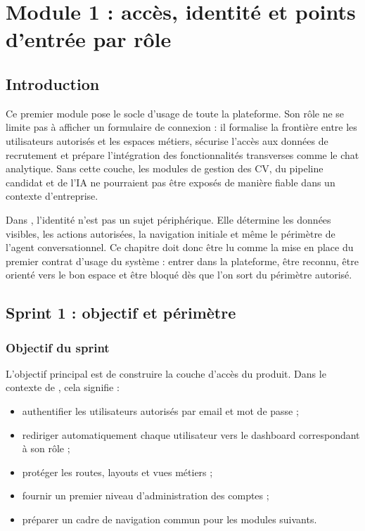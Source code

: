 \chapter{Module 1 : accès, identité et points d'entrée par rôle}

\section*{Introduction}
Ce premier module pose le socle d'usage de toute la plateforme. Son rôle ne se limite pas à afficher un formulaire de connexion : il formalise la frontière entre les utilisateurs autorisés et les espaces métiers, sécurise l'accès aux données de recrutement et prépare l'intégration des fonctionnalités transverses comme le chat analytique. Sans cette couche, les modules de gestion des CV, du pipeline candidat et de l'IA ne pourraient pas être exposés de manière fiable dans un contexte d'entreprise.

Dans \projectname{}, l'identité n'est pas un sujet périphérique. Elle détermine les données visibles, les actions autorisées, la navigation initiale et même le périmètre de l'agent conversationnel. Ce chapitre doit donc être lu comme la mise en place du premier contrat d'usage du système : entrer dans la plateforme, être reconnu, être orienté vers le bon espace et être bloqué dès que l'on sort du périmètre autorisé.

\section{Sprint 1 : objectif et périmètre}

\subsection{Objectif du sprint}
L'objectif principal est de construire la couche d'accès du produit. Dans le contexte de \projectname{}, cela signifie :
\begin{itemize}
  \item authentifier les utilisateurs autorisés par email et mot de passe ;
  \item rediriger automatiquement chaque utilisateur vers le dashboard correspondant à son rôle ;
  \item protéger les routes, layouts et vues métiers ;
  \item fournir un premier niveau d'administration des comptes ;
  \item préparer un cadre de navigation commun pour les modules suivants.
\end{itemize}

